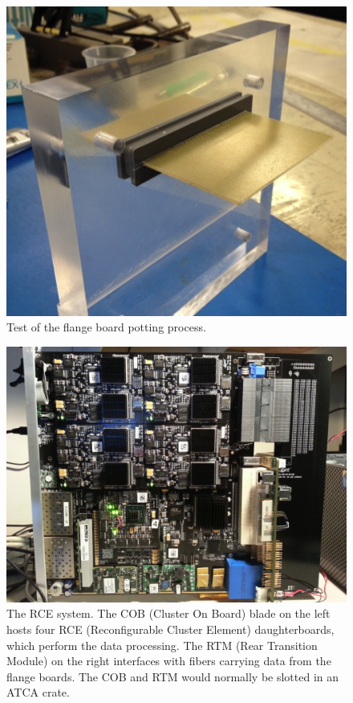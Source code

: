 \begin{figure}[ht]
    \includegraphics[width=\textwidth]{detector/figs/flangeboard_test}
    \caption{Test of the flange board potting process.}
    \label{fig:flangeboard_test}
\end{figure}

\begin{figure}[ht]
    \includegraphics[width=\textwidth]{detector/figs/rce}
    \caption{The RCE system. The COB (Cluster On Board) blade on the left hosts four RCE (Reconfigurable Cluster Element) daughterboards, which perform the data processing. The RTM (Rear Transition Module) on the right interfaces with fibers carrying data from the flange boards. The COB and RTM would normally be slotted in an ATCA crate.}
    \label{fig:rce}
\end{figure}


